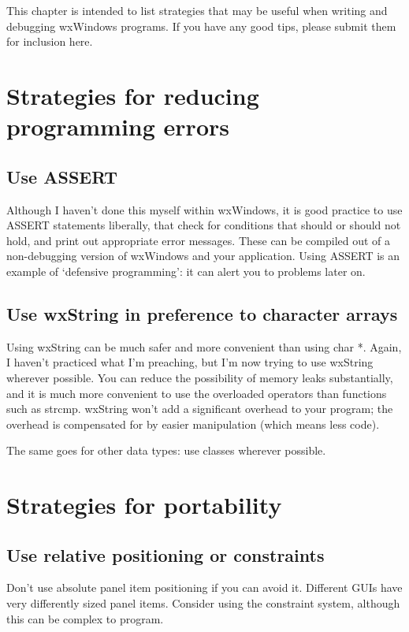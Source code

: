 This chapter is intended to list strategies that may be useful when
writing and debugging wxWindows programs. If you have any good tips,
please submit them for inclusion here.

\section{Strategies for reducing programming errors}

\subsection{Use ASSERT}

Although I haven't done this myself within wxWindows, it is good
practice to use ASSERT statements liberally, that check for conditions that
should or should not hold, and print out appropriate error messages.
These can be compiled out of a non-debugging version of wxWindows
and your application. Using ASSERT is an example of `defensive programming':
it can alert you to problems later on.

\subsection{Use wxString in preference to character arrays}

Using wxString can be much safer and more convenient than using char *.
Again, I haven't practiced what I'm preaching, but I'm now trying to use
wxString wherever possible. You can reduce the possibility of memory
leaks substantially, and it is much more convenient to use the overloaded
operators than functions such as strcmp. wxString won't add a significant
overhead to your program; the overhead is compensated for by easier
manipulation (which means less code).

The same goes for other data types: use classes wherever possible.

\section{Strategies for portability}

\subsection{Use relative positioning or constraints}

Don't use absolute panel item positioning if you can avoid it. Different GUIs have
very differently sized panel items. Consider using the constraint system, although this
can be complex to program.

